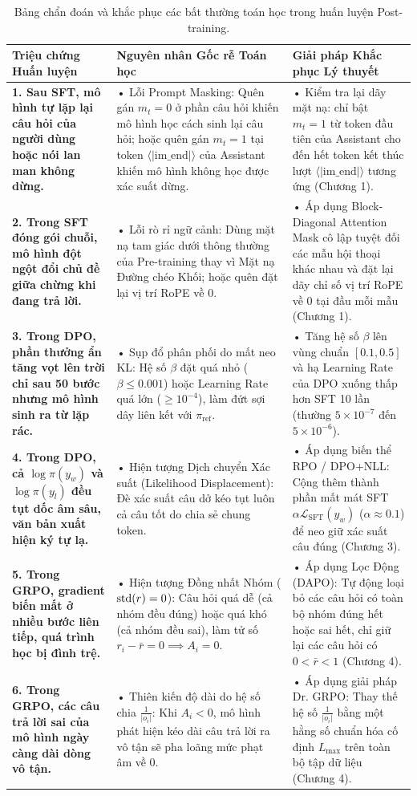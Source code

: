 \begin{table}[h!]
\centering
\small
\renewcommand{\arraystretch}{1.4}
\begin{tabularx}{\textwidth}{>{\bfseries}p{3.5cm} p{5.5cm} X}
\toprule
Triệu chứng Huấn luyện & Nguyên nhân Gốc rễ Toán học & Giải pháp Khắc phục Lý thuyết \\
\midrule
1. Sau SFT, mô hình tự lặp lại câu hỏi của người dùng hoặc nói lan man không dừng. & • Lỗi Prompt Masking: Quên gán $m_t = 0$ ở phần câu hỏi khiến mô hình học cách sinh lại câu hỏi; hoặc quên gán $m_t = 1$ tại token $\langle|\text{im\_end}|\rangle$ của Assistant khiến mô hình không học được xác suất dừng. & • Kiểm tra lại dãy mặt nạ: chỉ bật $m_t = 1$ từ token đầu tiên của Assistant cho đến hết token kết thúc lượt $\langle|\text{im\_end}|\rangle$ tương ứng (Chương 1). \\
\midrule
2. Trong SFT đóng gói chuỗi, mô hình đột ngột đổi chủ đề giữa chừng khi đang trả lời. & • Lỗi rò rỉ ngữ cảnh: Dùng mặt nạ tam giác dưới thông thường của Pre-training thay vì Mặt nạ Đường chéo Khối; hoặc quên đặt lại vị trí RoPE về $0$. & • Áp dụng Block-Diagonal Attention Mask cô lập tuyệt đối các mẫu hội thoại khác nhau và đặt lại dãy chỉ số vị trí RoPE về $0$ tại đầu mỗi mẫu (Chương 1). \\
\midrule
3. Trong DPO, phần thưởng ẩn tăng vọt lên trời chỉ sau 50 bước nhưng mô hình sinh ra từ lặp rác. & • Sụp đổ phân phối do mất neo KL: Hệ số $\beta$ đặt quá nhỏ ($\beta \le 0.001$) hoặc Learning Rate quá lớn ($\ge 10^{-4}$), làm đứt sợi dây liên kết với $\pi_{\text{ref}}$. & • Tăng hệ số $\beta$ lên vùng chuẩn $[0.1, 0.5]$ và hạ Learning Rate của DPO xuống thấp hơn SFT 10 lần (thường $5 \times 10^{-7}$ đến $5 \times 10^{-6}$). \\
\midrule
4. Trong DPO, cả $\log \pi(y_w)$ và $\log \pi(y_l)$ đều tụt dốc âm sâu, văn bản xuất hiện ký tự lạ. & • Hiện tượng Dịch chuyển Xác suất (Likelihood Displacement): Đè xác suất câu dở kéo tụt luôn cả câu tốt do chia sẻ chung token. & • Áp dụng biến thể RPO / DPO+NLL: Cộng thêm thành phần mất mát SFT $\alpha \mathcal{L}_{\text{SFT}}(y_w)$ ($\alpha \approx 0.1$) để neo giữ xác suất câu đúng (Chương 3). \\
\midrule
5. Trong GRPO, gradient biến mất ở nhiều bước liên tiếp, quá trình học bị đình trệ. & • Hiện tượng Đồng nhất Nhóm ($\operatorname{\mathrm{std}}(r) = 0$): Câu hỏi quá dễ (cả nhóm đều đúng) hoặc quá khó (cả nhóm đều sai), làm tử số $r_i - \bar{r} = 0 \implies A_i = 0$. & • Áp dụng Lọc Động (DAPO): Tự động loại bỏ các câu hỏi có toàn bộ nhóm đúng hết hoặc sai hết, chỉ giữ lại các câu hỏi có $0 < \bar{r} < 1$ (Chương 4). \\
\midrule
6. Trong GRPO, các câu trả lời sai của mô hình ngày càng dài dòng vô tận. & • Thiên kiến độ dài do hệ số chia $\frac{1}{|o_i|}$: Khi $A_i < 0$, mô hình phát hiện kéo dài câu trả lời ra vô tận sẽ pha loãng mức phạt âm về $0$. & • Áp dụng giải pháp Dr. GRPO: Thay thế hệ số $\frac{1}{|o_i|}$ bằng một hằng số chuẩn hóa cố định $L_{\max}$ trên toàn bộ tập dữ liệu (Chương 4). \\
\bottomrule
\end{tabularx}
\caption{Bảng chẩn đoán và khắc phục các bất thường toán học trong huấn luyện Post-training.}
\label{tab:troubleshooting}
\end{table}

